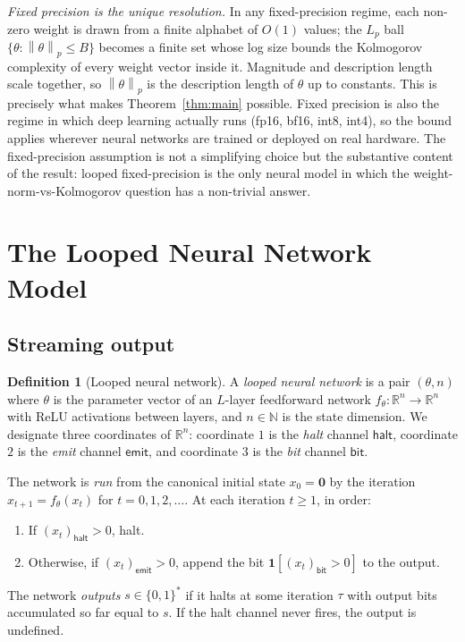 \documentclass{article}
\theoremstyle{definition}
\newtheorem{definition}[theorem]{Definition}
\newcommand{\R}{\mathbb{R}}
\newcommand{\N}{\mathbb{N}}
\newcommand{\B}{\{0,1\}}
\newcommand{\norm}[1]{\left\lVert#1\right\rVert}
\newcommand{\halt}{\mathsf{halt}}
\newcommand{\emit}{\mathsf{emit}}
\newcommand{\bit}{\mathsf{bit}}
\begin{document}
\emph{Fixed precision is the unique resolution.} In any fixed-precision regime,
each non-zero weight is drawn from a finite alphabet of $O(1)$ values; the
$L_p$ ball $\{\theta : \norm{\theta}_p \le B\}$ becomes a finite set whose log
size bounds the Kolmogorov complexity of every weight vector inside it.
Magnitude and description length scale together, so $\norm{\theta}_p$ is the
description length of $\theta$ up to constants. This is precisely what makes
Theorem~\ref{thm:main} possible. Fixed precision is also the regime in which
deep learning actually runs (fp16, bf16, int8, int4), so the bound applies
wherever neural networks are trained or deployed on real hardware. The
fixed-precision assumption is not a simplifying choice but the substantive
content of the result: looped fixed-precision is the only neural model in which
the weight-norm-vs-Kolmogorov question has a non-trivial answer.

\section{The Looped Neural Network Model}\label{sec:setup}

\subsection{Streaming output}\label{sec:setup:model}

\begin{definition}[Looped neural network]\label{def:lnn}
  A \emph{looped neural network} is a pair $(\theta, n)$ where $\theta$ is the parameter vector of an $L$-layer feedforward network $f_\theta : \R^n \to \R^n$ with ReLU activations between layers, and $n \in \N$ is the state dimension. We designate three coordinates of $\R^n$: coordinate $1$ is the \emph{halt} channel $\halt$, coordinate $2$ is the \emph{emit} channel $\emit$, and coordinate $3$ is the \emph{bit} channel $\bit$.

  The network is \emph{run} from the canonical initial state $x_0 = \mathbf{0}$
  by the iteration $x_{t+1} = f_\theta(x_t)$ for $t = 0, 1, 2, \ldots$. At each
  iteration $t \ge 1$, in order:
  \begin{enumerate}
    \item If $(x_t)_{\halt} > 0$, halt.
    \item Otherwise, if $(x_t)_{\emit} > 0$, append the bit $\mathbf{1}[(x_t)_{\bit} >
              0]$ to the output.
  \end{enumerate}
  The network \emph{outputs} $s \in \B^*$ if it halts at some iteration $\tau$ with output bits accumulated so far equal to $s$. If the halt channel never fires, the output is undefined.
\end{definition}
\end{document}
